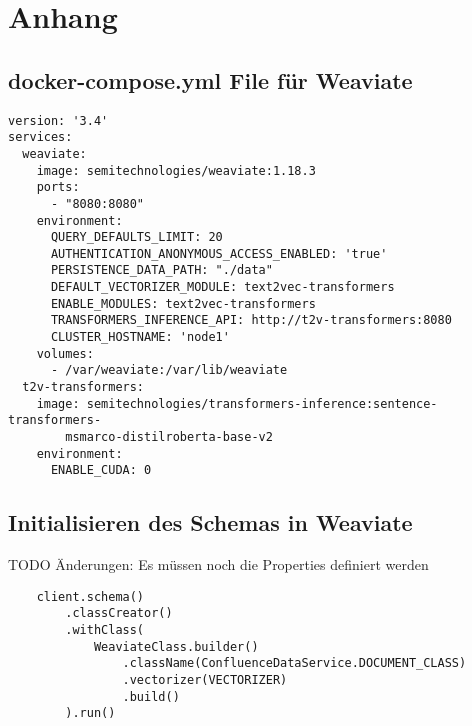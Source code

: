 \chapter{Anhang}
\label{chap:appendix}

\section{docker-compose.yml File für Weaviate}
\begin{verbatim}
version: '3.4'
services:
  weaviate:
    image: semitechnologies/weaviate:1.18.3
    ports:
      - "8080:8080"
    environment:
      QUERY_DEFAULTS_LIMIT: 20
      AUTHENTICATION_ANONYMOUS_ACCESS_ENABLED: 'true'
      PERSISTENCE_DATA_PATH: "./data"
      DEFAULT_VECTORIZER_MODULE: text2vec-transformers
      ENABLE_MODULES: text2vec-transformers
      TRANSFORMERS_INFERENCE_API: http://t2v-transformers:8080
      CLUSTER_HOSTNAME: 'node1'
    volumes:
      - /var/weaviate:/var/lib/weaviate
  t2v-transformers:
    image: semitechnologies/transformers-inference:sentence-transformers-
        msmarco-distilroberta-base-v2
    environment:
      ENABLE_CUDA: 0
\end{verbatim}

\section{Initialisieren des Schemas in Weaviate}
TODO Änderungen: Es müssen noch die Properties definiert werden
\begin{verbatim}
    client.schema()
        .classCreator()
        .withClass(
            WeaviateClass.builder()
                .className(ConfluenceDataService.DOCUMENT_CLASS)
                .vectorizer(VECTORIZER)
                .build()
        ).run()
\end{verbatim}